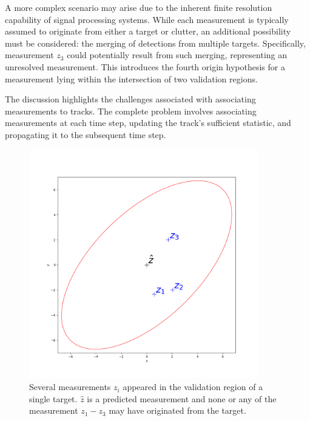 A more complex scenario may arise due to the inherent finite resolution capability of signal processing systems.
While each measurement is typically assumed to originate from either a target or clutter, an additional possibility
must be considered: the merging of detections from multiple targets. Specifically, measurement $z_3$ could
potentially result from such merging, representing an unresolved measurement. This introduces the fourth origin hypothesis for a measurement lying within the intersection of two validation regions.

The discussion highlights the challenges associated with associating measurements to tracks. The complete problem
involves associating measurements at each time step, updating the track's sufficient statistic, and propagating it to
the subsequent time step.
\begin{figure}[H]
    \centering
    \includegraphics[width=10cm]{text/chapter_02/imgs/clutter_singleTarget}
    \caption{Several measurements $z_i$ appeared in the validation region of a single target. $\hat{z}$ is a predicted
    measurement and none or any of the measurement $z_1 - z_3$ may have originated from the target.}
    \label{fig:singleTargetInClutter}
\end{figure}

